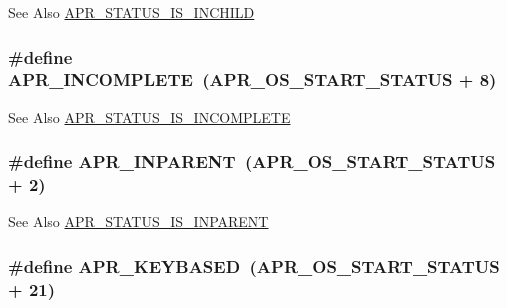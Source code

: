 \begin{DoxySeeAlso}{See Also}
\hyperlink{group___a_p_r___s_t_a_t_u_s___i_s_gad60d170a73ed74ec209a1b2165cacb61}{A\-P\-R\-\_\-\-S\-T\-A\-T\-U\-S\-\_\-\-I\-S\-\_\-\-I\-N\-C\-H\-I\-L\-D} 
\end{DoxySeeAlso}
\hypertarget{group___a_p_r___error_ga64dff43b83bcefd3f3c751be6b864ca1}{
\subsubsection[{A\-P\-R\-\_\-\-I\-N\-C\-O\-M\-P\-L\-E\-T\-E}]{\setlength{\rightskip}{0pt plus 5cm}\#define A\-P\-R\-\_\-\-I\-N\-C\-O\-M\-P\-L\-E\-T\-E~({\bf A\-P\-R\-\_\-\-O\-S\-\_\-\-S\-T\-A\-R\-T\-\_\-\-S\-T\-A\-T\-U\-S} + 8)}}\label{group___a_p_r___error_ga64dff43b83bcefd3f3c751be6b864ca1}
\begin{DoxySeeAlso}{See Also}
\hyperlink{group___a_p_r___s_t_a_t_u_s___i_s_ga8385878e572abf0b2f78a0ab7d1bc8a5}{A\-P\-R\-\_\-\-S\-T\-A\-T\-U\-S\-\_\-\-I\-S\-\_\-\-I\-N\-C\-O\-M\-P\-L\-E\-T\-E} 
\end{DoxySeeAlso}
\hypertarget{group___a_p_r___error_ga79abc0fb43e51e0db87f90fa49745d89}{
\subsubsection[{A\-P\-R\-\_\-\-I\-N\-P\-A\-R\-E\-N\-T}]{\setlength{\rightskip}{0pt plus 5cm}\#define A\-P\-R\-\_\-\-I\-N\-P\-A\-R\-E\-N\-T~({\bf A\-P\-R\-\_\-\-O\-S\-\_\-\-S\-T\-A\-R\-T\-\_\-\-S\-T\-A\-T\-U\-S} + 2)}}\label{group___a_p_r___error_ga79abc0fb43e51e0db87f90fa49745d89}
\begin{DoxySeeAlso}{See Also}
\hyperlink{group___a_p_r___s_t_a_t_u_s___i_s_ga4471f8de6eda3a673aa1f306114c012e}{A\-P\-R\-\_\-\-S\-T\-A\-T\-U\-S\-\_\-\-I\-S\-\_\-\-I\-N\-P\-A\-R\-E\-N\-T} 
\end{DoxySeeAlso}
\hypertarget{group___a_p_r___error_gaac52bebace264494fa94cdf0b4344d26}{
\subsubsection[{A\-P\-R\-\_\-\-K\-E\-Y\-B\-A\-S\-E\-D}]{\setlength{\rightskip}{0pt plus 5cm}\#define A\-P\-R\-\_\-\-K\-E\-Y\-B\-A\-S\-E\-D~({\bf A\-P\-R\-\_\-\-O\-S\-\_\-\-S\-T\-A\-R\-T\-\_\-\-S\-T\-A\-T\-U\-S} + 21)}}\label{group___a_p_r___error_gaac52bebace264494fa94cdf0b4344d26}
